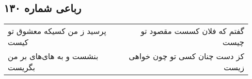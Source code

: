 \begin{center}
\section*{رباعی شماره ۱۳۰}
\label{sec:sh130}
\begin{longtable}{l p{0.5cm} r}
پرسید ز من کسیکه معشوق تو کیست
&&
گفتم که فلان کسست مقصود تو چیست
\\
بنشست و به های‌های بر من بگریست
&&
کز دست چنان کسی تو چون خواهی زیست
\\
\end{longtable}
\end{center}
